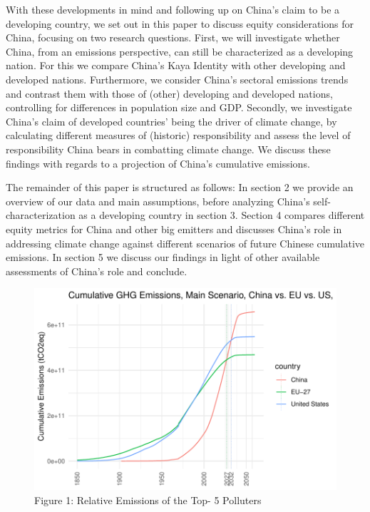 \documentclass[
  12pt,
]{article}
\numberwithin{equation}{section}
\numberwithin{table}{section}
\numberwithin{figure}{section}
\begin{document}
With these developments in mind and following up on China's claim to be
a developing country, we set out in this paper to discuss equity
considerations for China, focusing on two research questions. First, we
will investigate whether China, from an emissions perspective, can still
be characterized as a developing nation. For this we compare China's
Kaya Identity with other developing and developed nations. Furthermore,
we consider China's sectoral emissions trends and contrast them with
those of (other) developing and developed nations, controlling for
differences in population size and GDP. Secondly, we investigate China's
claim of developed countries' being the driver of climate change, by
calculating different measures of (historic) responsibility and assess
the level of responsibility China bears in combatting climate change. We
discuss these findings with regards to a projection of China's
cumulative emissions.

The remainder of this paper is structured as follows: In section 2 we
provide an overview of our data and main assumptions, before analyzing
China's self-characterization as a developing country in section 3.
Section 4 compares different equity metrics for China and other big
emitters and discusses China's role in addressing climate change against
different scenarios of future Chinese cumulative emissions. In section 5
we discuss our findings in light of other available assessments of
China's role and conclude.

\begin{figure}
\centering
\includegraphics{Paper_files/figure-latex/unnamed-chunk-1-1.pdf}
\caption{Figure 1: Relative Emissions of the Top- 5 Polluters}
\end{figure}
\end{document}
